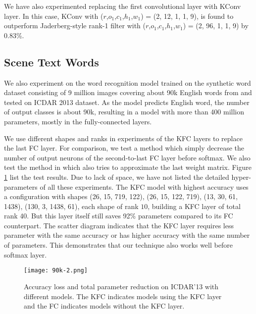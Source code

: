 \documentclass{article}
\begin{document}
We have also experimented replacing the first convolutional layer with KConv layer. In this case, KConv with ($r$,$o_1$,$c_1$,$h_1$,$w_1$) = (2, 12, 1, 1, 9), is found to outperform Jaderberg-style rank-1 filter with ($r$,$o_1$,$c_1$,$h_1$,$w_1$) = (2, 96, 1, 1, 9) by 0.83\%.


\subsection{Scene Text Words}
We also experiment on the word recognition model trained on the synthetic word dataset consisting of 9 million images covering about 90k English words from \cite{Jaderberg14c} and tested on ICDAR 2013\cite{karatzas2013icdar} dataset.
As the model predicts English word, the number of output classes is about 90k, resulting in a model with more than 400 million parameters,
mostly in the fully-connected layers.

We use
different shapes and ranks in experiments of the KFC layers to replace the last FC layer.
For comparison, we test a method which simply decrease the number of output neurons of
the second-to-last FC layer before softmax. We also test the method in \cite{sainath2013low} which also tries to approximate the last weight matrix. Figure \ref{fig:90k}
list the test results. Due to lack of space, we have not listed the detailed hyper-parameters of all these experiments.
The KFC model with highest
accuracy uses a configuration with shapes (26, 15, 719, 122), (26, 15, 122, 719), (13, 30, 61, 1438), (130, 3, 1438, 61),
each shape of rank $10$,
building a KFC layer of total rank 40. But this layer itself still saves 92\% parameters compared to its FC counterpart.
The scatter diagram indicates that the KFC layer requires less parameter with the same accuracy or has higher accuracy with the same number of
parameters. This demonstrates that our technique also works well before softmax layer.
\begin{figure}
\centering
\texttt{[image: 90k-2.png]}
\caption{Accuracy loss and total parameter reduction on ICDAR'13 with different models. The KFC indicates models using the KFC layer and the FC indicates models without the KFC layer.}
\label{fig:90k}
\end{figure}
\end{document}
